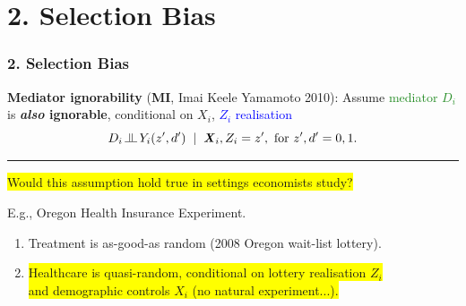 \documentclass[dvipsnames]{beamer} %
\renewcommand{\vec}[1]{\boldsymbol{\mathit{#1}}}                           %
\newcommand{\indep}{\, \raisebox{0.05em}{\rotatebox[origin=c]{90}{$\models$}} \,}%
\begin{document}
\section{2. Selection Bias}
\begin{frame}
    \frametitle{2. Selection Bias}
    \textbf{Mediator ignorability} (\textbf{MI}, Imai Keele Yamamoto 2010):
    \vskip0.125cm
    Assume \textcolor{ForestGreen}{mediator $D_i$} is \textbf{\textit{also} ignorable}, conditional on $\vec X_i$, \textcolor{blue}{$Z_i$ realisation}
    \[ D_i \indep Y_i(z', d') \;\; | \;\; \vec X_i, Z_i = z',
        \text{ for } z', d' = 0, 1. \]
    \vskip-0.25cm
    \par\noindent\rule{\textwidth}{0.4pt}
    \colorbox{yellow}{Would this assumption hold true in settings economists study?}

    \vskip0.25cm    
    E.g., Oregon Health Insurance Experiment.
    \begin{figure}
    \end{figure}
    \begin{enumerate}
        \item Treatment is as-good-as random (2008 Oregon wait-list lottery).
        \item \colorbox{yellow}{Healthcare is quasi-random, conditional on lottery realisation $Z_i$} \\
        \colorbox{yellow}{and demographic controls $\vec X_i$ (no natural experiment...).}
    \end{enumerate}
\end{frame}
\end{document}
